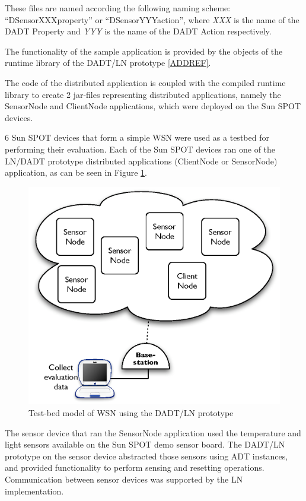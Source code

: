 These files are named according the following naming scheme:
``DSensorXXXproperty'' or ``DSensorYYYaction'', where \emph{XXX} is the name of the
DADT Property and \emph{YYY} is the name of the DADT Action respectively. 

The functionality of the sample application is provided by the objects
of the runtime library of the DADT/LN prototype \ref{ADDREF}.  

The code of the distributed application is coupled with the
compiled runtime library to create 2 jar-files representing distributed
applications, namely the SensorNode and ClientNode applications, which were
deployed on the Sun SPOT devices.

6 Sun SPOT devices that form a simple WSN were used as a testbed for performing
their evaluation. Each of the Sun SPOT devices ran one of the LN/DADT prototype
distributed applications (ClientNode or SensorNode) application, as can be seen
in Figure \ref{Fig:EvaluationConfig}.

\begin{figure}
\centering
\includegraphics[scale=0.50]{img/EvaluationConfig.eps} 
\caption[Test-bed model of WSN using the DADT/LN prototype]{Test-bed model of WSN using the DADT/LN prototype}
\label{Fig:EvaluationConfig}
\end{figure}

The sensor device that ran the SensorNode application used the temperature and
light sensors available on the Sun SPOT demo sensor board. The DADT/LN prototype
on the sensor device abstracted those sensors using ADT instances, and provided
functionality to perform sensing and resetting operations. Communication between
sensor devices was supported by the LN implementation.

